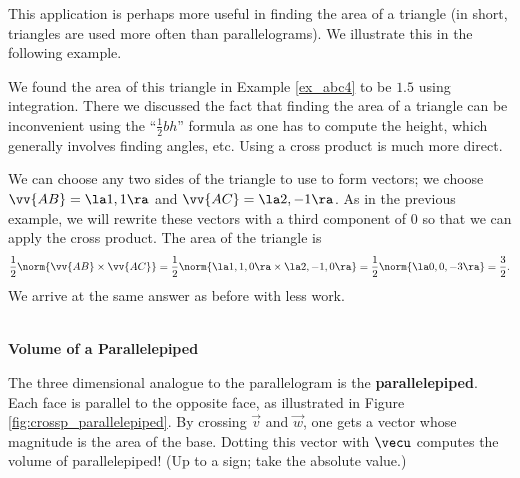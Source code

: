 This application is perhaps more useful in finding the area of a triangle (in short, triangles are used more often than parallelograms). We illustrate this in the following example.\\

{We found the area of this triangle in Example \ref{ex_abc4} to be $1.5$ using integration. There we discussed the fact that finding the area of a triangle can be inconvenient using the ``$\frac12bh$'' formula as one has to compute the height, which generally involves finding angles, etc. Using a cross product is much more direct.

We can choose any two sides of the triangle to use to form vectors; we choose $\vv{AB} = \la 1,1\ra$ and $\vv{AC}=\la 2,-1\ra$. As in the previous example, we will rewrite these vectors with a third component of 0 so that we can apply the cross product. The area of the triangle is
$$\frac12\norm{\vv{AB}\times\vv{AC}} = \frac12\norm{\la 1,1,0\ra \times \la 2,-1,0\ra} = \frac12\norm{\la 0,0,-3\ra} = \frac32.$$
We arrive at the same answer as before with less work.
}\\

\noindent\textbf{Volume of a Parallelepiped}

The three dimensional analogue to the parallelogram is the \textbf{parallelepiped}. Each face is parallel to the opposite face, as illustrated in Figure \ref{fig:crossp_parallelepiped}. By crossing $\vec v$ and $\vec w$, one gets a vector whose magnitude is the area of the base. Dotting this vector with $\vecu$ computes the volume of parallelepiped! (Up to a sign; take the absolute value.)

